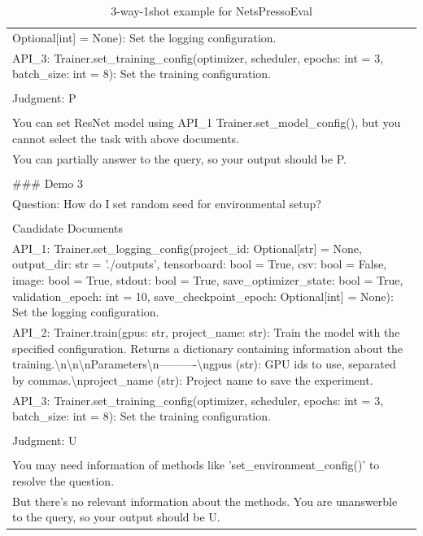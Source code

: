 \begin{table}[h!]
\begin{tabularx}{\textwidth}{|X|}
Optional{[}int{]} = None): Set the logging configuration.\\ API\_3: Trainer.set\_training\_config(optimizer, scheduler, epochs: int = 3, batch\_size: int = 8): Set the training configuration.\\ \\ Judgment: P\\ \\ You can set ResNet model using API\_1 Trainer.set\_model\_config(), but you cannot select the task with above documents.\\ You can partially answer to the query, so your output should be P.\\ \\ \#\#\# Demo 3\\ Question: How do I set random seed for environmental setup?\\ \\ Candidate Documents\\ API\_1: Trainer.set\_logging\_config(project\_id: Optional{[}str{]} = None, output\_dir: str = './outputs', tensorboard: bool = True, csv: bool = False, image: bool = True, stdout: bool = True, save\_optimizer\_state: bool = True, validation\_epoch: int = 10, save\_checkpoint\_epoch: Optional{[}int{]} = None): Set the logging configuration.\\ API\_2: Trainer.train(gpus: str, project\_name: str): Train the model with the specified configuration. Returns a dictionary containing information about the training.\textbackslash{}n\textbackslash{}n\textbackslash{}nParameters\textbackslash{}n----------\textbackslash{}ngpus (str): GPU ids to use, separated by commas.\textbackslash{}nproject\_name (str): Project name to save the experiment.\\ API\_3: Trainer.set\_training\_config(optimizer, scheduler, epochs: int = 3, batch\_size: int = 8): Set the training configuration.\\ \\ Judgment: U\\ \\ You may need information of methods like 'set\_environment\_config()' to resolve the question.\\ But there's no relevant information about the methods. You are unanswerble to the query, so your output should be U. \\ \hline
\end{tabularx}
\caption{3-way-1shot example for NetsPressoEval}
\label{tab:2shot_prompt_netspressoeval}
\end{table}